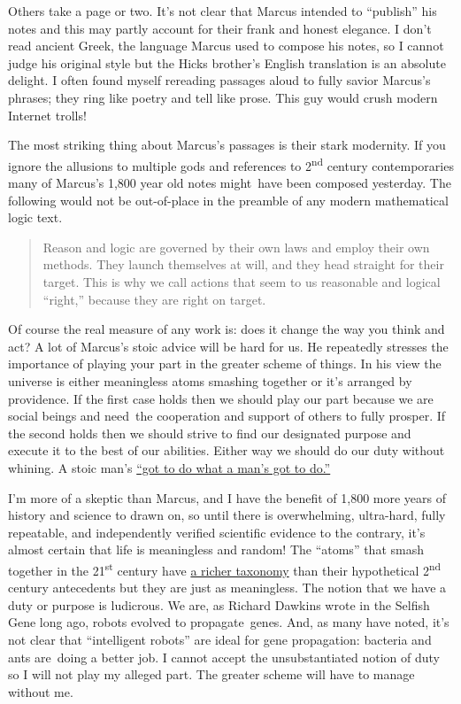 Others take a page or two. It's not clear that Marcus intended to
``publish'' his notes and this may partly account for their frank and
honest elegance. I don't read ancient Greek, the language Marcus used to
compose his notes, so I cannot judge his original style but the Hicks
brother's English translation is an absolute delight. I often found
myself rereading passages aloud to fully savior Marcus's phrases; they
ring like poetry and tell like prose. This guy would crush modern
Internet trolls!

The most striking thing about Marcus's passages is their stark
modernity. If you ignore the allusions to multiple gods and references
to 2\textsuperscript{nd} century contemporaries many of Marcus's 1,800
year old notes might~have been composed yesterday. The following would
not be out-of-place in the preamble of any modern mathematical logic
text.

\begin{quote}
Reason and logic are governed by their own laws and employ their own
methods. They launch themselves at will, and they head straight for
their target. This is why we call actions that seem to us reasonable and
logical ``right,'' because they are right on target.
\end{quote}

Of course the real measure of any work is: does it change the way you
think and act? A lot of Marcus's stoic advice will be hard for us. He
repeatedly stresses the importance of playing your part in the greater
scheme of things. In his view the universe is either meaningless atoms
smashing together or it's arranged by providence. If the first case
holds then we should play our part because we are social beings and
need~the cooperation and support of others to fully prosper. If the
second holds then we should strive to find our designated purpose and
execute it to the best of our abilities. Either way we should do our
duty without whining. A stoic man's
\href{https://www.goodreads.com/quotes/148061-a-man-s-got-to-do-what-a-man-s-got-to}{``got
to do what a man's got to do.''}

I'm more of a skeptic than Marcus, and I have the benefit of 1,800 more
years of history and science to drawn on, so until there is
overwhelming, ultra-hard, fully repeatable, and independently verified
scientific evidence to the contrary, it's almost certain that life is
meaningless and random! The ``atoms'' that smash together in the
21\textsuperscript{st} century have
\href{http://scienceblogs.com/startswithabang/2010/09/27/the-new-nu-news/}{a
richer taxonomy} than their hypothetical 2\textsuperscript{nd} century
antecedents but they are just as meaningless. The notion that we have a
duty or purpose is ludicrous. We are, as Richard Dawkins wrote in the
Selfish Gene long ago, robots evolved to propagate~genes. And, as many
have noted, it's not clear that ``intelligent robots'' are ideal for
gene propagation: bacteria and ants are~doing a better job. I cannot
accept the unsubstantiated notion of duty so I will not play my alleged
part. The greater scheme will have to manage without me.

